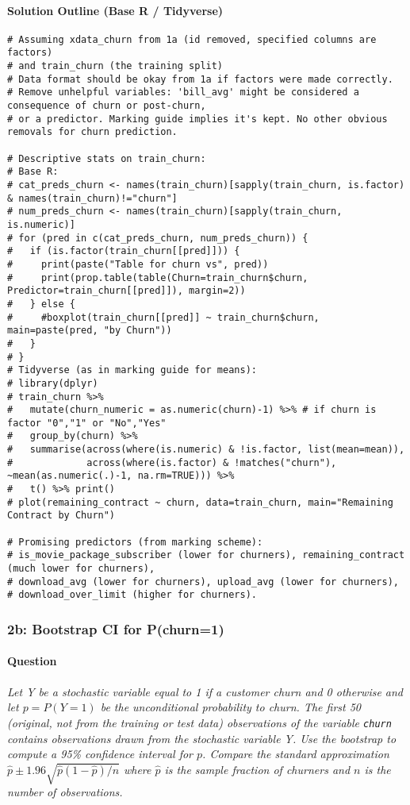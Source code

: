 \documentclass[12pt,a4paper]{article}
\newcommand{\Rcode}[1]{\texttt{#1}} %
\begin{document}
        \paragraph{Solution Outline (Base R / Tidyverse)}
\begin{lstlisting}
# Assuming xdata_churn from 1a (id removed, specified columns are factors)
# and train_churn (the training split)
# Data format should be okay from 1a if factors were made correctly.
# Remove unhelpful variables: 'bill_avg' might be considered a consequence of churn or post-churn,
# or a predictor. Marking guide implies it's kept. No other obvious removals for churn prediction.

# Descriptive stats on train_churn:
# Base R:
# cat_preds_churn <- names(train_churn)[sapply(train_churn, is.factor) & names(train_churn)!="churn"]
# num_preds_churn <- names(train_churn)[sapply(train_churn, is.numeric)]
# for (pred in c(cat_preds_churn, num_preds_churn)) {
#   if (is.factor(train_churn[[pred]])) {
#     print(paste("Table for churn vs", pred))
#     print(prop.table(table(Churn=train_churn$churn, Predictor=train_churn[[pred]]), margin=2))
#   } else {
#     #boxplot(train_churn[[pred]] ~ train_churn$churn, main=paste(pred, "by Churn"))
#   }
# }
# Tidyverse (as in marking guide for means):
# library(dplyr)
# train_churn %>% 
#   mutate(churn_numeric = as.numeric(churn)-1) %>% # if churn is factor "0","1" or "No","Yes"
#   group_by(churn) %>% 
#   summarise(across(where(is.numeric) & !is.factor, list(mean=mean)),
#             across(where(is.factor) & !matches("churn"), ~mean(as.numeric(.)-1, na.rm=TRUE))) %>%
#   t() %>% print()
# plot(remaining_contract ~ churn, data=train_churn, main="Remaining Contract by Churn")

# Promising predictors (from marking scheme):
# is_movie_package_subscriber (lower for churners), remaining_contract (much lower for churners),
# download_avg (lower for churners), upload_avg (lower for churners),
# download_over_limit (higher for churners).
\end{lstlisting}

    \subsubsection{2b: Bootstrap CI for P(churn=1)}
        \paragraph{Question}
        \textit{Let Y be a stochastic variable equal to 1 if a customer churn and 0 otherwise and let $p = P(Y = 1)$ be the unconditional probability to churn. The first 50 (original, not from the training or test data) observations of the variable \Rcode{churn} contains observations drawn from the stochastic variable Y. Use the bootstrap to compute a 95\% confidence interval for $p$. Compare the standard approximation $\hat{p} \pm 1.96 \sqrt{\hat{p}(1-\hat{p})/n}$ where $\hat{p}$ is the sample fraction of churners and $n$ is the number of observations.}
\end{document}
